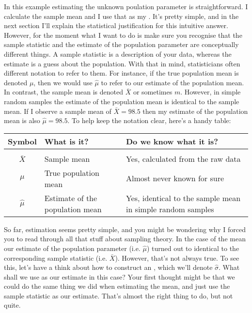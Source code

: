 In this example estimating the unknown poulation parameter is straightforward. I calculate the sample mean and I use that as my . It's pretty simple, and in the next section I'll explain the statistical justification for this intuitive answer. However, for the moment what I want to do is make sure you recognise that the sample statistic and the estimate of the population parameter are conceptually different things. A sample statistic is a description of your data, whereas the estimate is a guess about the population. With that in mind, statisticians often different notation to refer to them. For instance, if the true population mean is denoted $\mu$, then we would use $\hat\mu$ to refer to our estimate of the population mean. In contrast, the sample mean is denoted $\bar{X}$ or sometimes $m$. However, in simple random samples the estimate of the population mean is identical to the sample mean. If I observe a sample mean of $\bar{X} = 98.5$ then my estimate of the population mean is also $\hat\mu = 98.5$. To help keep the notation clear, here's a handy table:

\smallskip
\begin{center}
\small 
\begin{tabular}{clp{6cm}}
Symbol & What is it? & Do we know what it is? \\ \hline \\[-6pt]
$\bar{X}$ & Sample mean & Yes, calculated from the raw data \\
$\mu$ & True population mean & Almost never known for sure \\
$\hat{\mu}$ & Estimate of the population mean & Yes, identical to the sample mean in simple random samples
\end{tabular}
\end{center}


So far, estimation seems pretty simple, and you might be wondering why I forced you to read through all that stuff about sampling theory. In the case of the mean our estimate of the population parameter (i.e. $\hat\mu$) turned out to identical to the corresponding sample statistic (i.e. $\bar{X}$). However, that's not always true. To see this, let's have a think about how to construct an , which we'll denote  $\hat\sigma$. What shall we use as our estimate in this case? Your first thought might be that we could do the same thing we did when estimating the mean, and just use the sample statistic as our estimate. That's almost the right thing to do, but not quite. 

